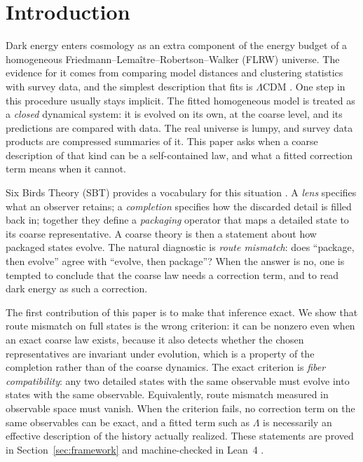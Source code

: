 \documentclass[11pt]{article}
\theoremstyle{plain}
\theoremstyle{definition}
\theoremstyle{remark}
\begin{document}
\section{Introduction}\label{sec:intro}

Dark energy enters cosmology as an extra component of the energy budget of a homogeneous Friedmann--Lema\^{i}tre--Robertson--Walker (FLRW) universe. The evidence for it comes from comparing model distances and clustering statistics with survey data, and the simplest description that fits is $\Lambda$CDM \cite{Riess1998SN,Perlmutter1999SN,Weinberg2013Acceleration}. One step in this procedure usually stays implicit. The fitted homogeneous model is treated as a \emph{closed} dynamical system: it is evolved on its own, at the coarse level, and its predictions are compared with data. The real universe is lumpy, and survey data products are compressed summaries of it. This paper asks when a coarse description of that kind can be a self-contained law, and what a fitted correction term means when it cannot.

Six Birds Theory (SBT) provides a vocabulary for this situation \cite{Tsiokos2026SixBirds,Tsiokos2026WakeStone}. A \emph{lens} specifies what an observer retains; a \emph{completion} specifies how the discarded detail is filled back in; together they define a \emph{packaging} operator that maps a detailed state to its coarse representative. A coarse theory is then a statement about how packaged states evolve. The natural diagnostic is \emph{route mismatch}: does ``package, then evolve'' agree with ``evolve, then package''? When the answer is no, one is tempted to conclude that the coarse law needs a correction term, and to read dark energy as such a correction.

The first contribution of this paper is to make that inference exact. We show that route mismatch on full states is the wrong criterion: it can be nonzero even when an exact coarse law exists, because it also detects whether the chosen representatives are invariant under evolution, which is a property of the completion rather than of the coarse dynamics. The exact criterion is \emph{fiber compatibility}: any two detailed states with the same observable must evolve into states with the same observable. Equivalently, route mismatch measured in observable space must vanish. When the criterion fails, no correction term on the same observables can be exact, and a fitted term such as $\Lambda$ is necessarily an effective description of the history actually realized. These statements are proved in Section~\ref{sec:framework} and machine-checked in Lean~4 \cite{Moura2021Lean4}.
\end{document}
